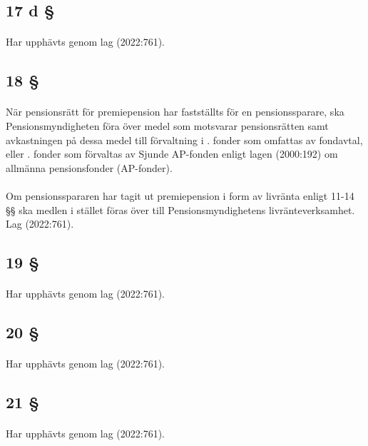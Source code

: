 \documentclass[a4paper,notitlepage,openany,10pt]{book}
\begin{document}
\subsection*{17 d §}
\paragraph*{}
Har upphävts genom
lag (2022:761).
\subsection*{18 §}
\paragraph*{}
När pensionsrätt för premiepension har fastställts för en pensionssparare, ska Pensionsmyndigheten föra över medel som motsvarar pensionsrätten samt avkastningen på dessa medel till förvaltning i
. fonder som omfattas av fondavtal, eller
. fonder som förvaltas av Sjunde AP-fonden enligt lagen (2000:192) om allmänna pensionsfonder (AP-fonder).
\paragraph*{}
Om pensionsspararen har tagit ut premiepension i form av livränta enligt 11-14 §§ ska medlen i stället föras över till Pensionsmyndighetens livränteverksamhet.
Lag (2022:761).
\subsection*{19 §}
\paragraph*{}
Har upphävts genom
lag (2022:761).
\subsection*{20 §}
\paragraph*{}
Har upphävts genom
lag (2022:761).
\subsection*{21 §}
\paragraph*{}
Har upphävts genom
lag (2022:761).
\end{document}
